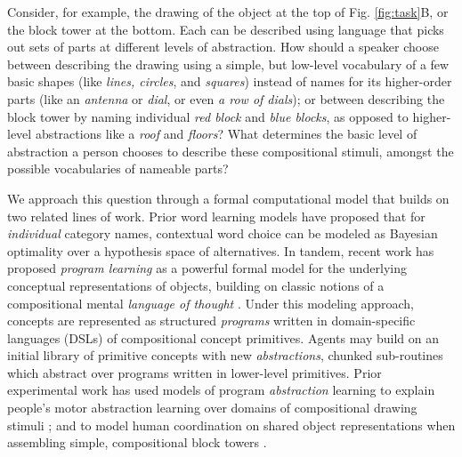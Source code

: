 \documentclass[10pt,letterpaper]{article}
\begin{document}
Consider, for example, the drawing of the object at the top of Fig. \ref{fig:task}B, or the block tower at the bottom. Each can be described using language that picks out sets of parts at different levels of abstraction. How should a speaker choose between describing the drawing using a simple, but low-level vocabulary of a few basic shapes (like \textit{lines, circles}, and \textit{squares}) instead of names for its higher-order parts (like an \textit{antenna} or \textit{dial}, or even \textit{a row of dials}); or between describing the block tower by naming individual \textit{red block} and \textit{blue blocks}, as opposed to higher-level abstractions like a \textit{roof} and \textit{floors}? What determines the basic level of abstraction a person chooses to describe these compositional stimuli, amongst the possible vocabularies of nameable parts?

We approach this question through a formal computational model that builds on two related lines of work. Prior word learning models  have proposed that for \textit{individual} category names, contextual word choice can be modeled as Bayesian optimality over a hypothesis space of alternatives. In tandem, recent work has proposed \textit{program learning} as a powerful formal model for the underlying conceptual representations of objects, building on classic notions of a compositional mental \textit{language of thought} . Under this modeling approach, concepts are represented as structured \textit{programs} written in  domain-specific languages (DSLs) of compositional concept primitives. Agents may build on an initial library of primitive concepts with new \textit{abstractions}, chunked sub-routines which abstract over programs written in lower-level primitives. Prior experimental work has used models of program \textit{abstraction} learning to explain people's motor abstraction learning over domains of compositional drawing stimuli ; and to model human coordination on shared object representations when assembling simple, compositional block towers .


\end{document}
